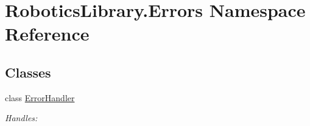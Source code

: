 \hypertarget{namespace_robotics_library_1_1_errors}{}\section{Robotics\+Library.\+Errors Namespace Reference}
\label{namespace_robotics_library_1_1_errors}
\subsection*{Classes}
\begin{DoxyCompactItemize}
\item 
class \hyperlink{class_robotics_library_1_1_errors_1_1_error_handler}{Error\+Handler}
\begin{DoxyCompactList}\small\item\em Handles\+: \end{DoxyCompactList}\end{DoxyCompactItemize}
